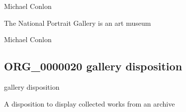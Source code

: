 \documentclass[letterpaper,10pt,english]{sphinxmanual}
\begin{document}
\begin{sphinxShadowBox}

\sphinxAtStartPar
Michael Conlon 
\end{sphinxShadowBox}

\begin{sphinxShadowBox}

\sphinxAtStartPar
The National Portrait Gallery is an art museum
\end{sphinxShadowBox}

\begin{sphinxShadowBox}

\sphinxAtStartPar
Michael Conlon 
\end{sphinxShadowBox}
\begin{quote}

\ignorespaces \end{quote}


\subsection{ORG\_0000020 \sphinxhyphen{} gallery disposition}
\label{\detokenize{doc-ORG_0000020:org-0000020-gallery-disposition}}\label{\detokenize{doc-ORG_0000020:index-0}}\label{\detokenize{doc-ORG_0000020::doc}}
\begin{sphinxShadowBox}

\sphinxAtStartPar
gallery disposition
\end{sphinxShadowBox}

\begin{sphinxShadowBox}

\sphinxAtStartPar
{\hyperref[\detokenize{doc-BFO_0000016::doc}]{}}
\end{sphinxShadowBox}

\begin{sphinxShadowBox}

\sphinxAtStartPar
A disposition to display collected works from an archive
\end{sphinxShadowBox}
\end{document}
